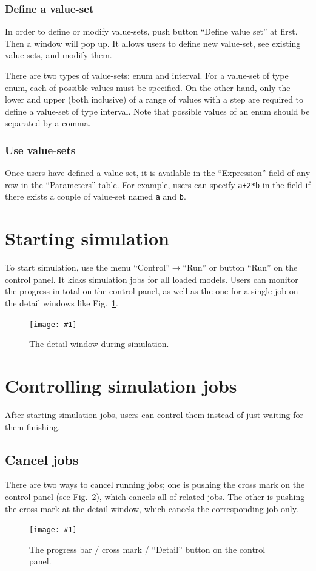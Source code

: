 \documentclass[a4paper,10pt]{report}
\newcommand\FigureOfImage[2]{\begin{figure}[h]
  \centering
  \texttt{[image: \#1]}
  \caption{#2}\label{fig:#1}
\end{figure}}
\begin{document}
\subsubsection{Define a value-set}
In order to define or modify value-sets, push button ``Define value set'' at
first. Then a window will pop up. It allows users to define new value-set,
see existing value-sets, and modify them.

There are two types of value-sets: enum and interval. For a value-set of type
enum, each of possible values must be specified. On the other hand, only the
lower and upper (both inclusive) of a range of values with a step are required
to define a value-set of type interval.
Note that possible values of an enum should be separated by a comma.

\subsubsection{Use value-sets}
Once users have defined a value-set, it is available in the ``Expression''
field of any row in the ``Parameters'' table. For example, users can specify
{\tt a+2*b} in the field if there exists a couple of value-set named {\tt a} and
{\tt b}.

\section{Starting simulation}
To start simulation, use the menu ``Control''$\rightarrow$``Run'' or button
``Run'' on the control panel. It kicks simulation jobs for all loaded models.
Users can monitor the progress in total on the control panel, as well as the
one for a single job on the detail windows like Fig.~\ref{fig:lr-detail}.
\FigureOfImage{lr-detail}{The detail window during simulation.}

\section{Controlling simulation jobs}
After starting simulation jobs, users can control them instead of just waiting
for them finishing.

\subsection{Cancel jobs}
There are two ways to cancel running jobs; one is pushing the cross mark on
the control panel (see Fig.~\ref{fig:lr-progress}), which cancels all of related
jobs. The other is pushing the cross mark at the detail window, which cancels the
corresponding job only.
\FigureOfImage{lr-progress}{The progress bar / cross mark / ``Detail'' button on
 the control panel.}
\end{document}
